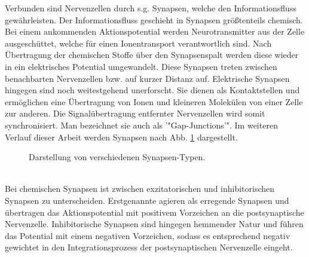 	Verbunden sind Nervenzellen durch s.g. Synapsen, welche den Informationsfluss gewährleisten. Der Informationsfluss geschieht in Synapsen größtenteils chemisch. Bei einem ankommenden Aktionspotential werden Neurotransmitter aus der Zelle ausgeschüttet, welche für einen Ionentransport verantwortlich sind. Nach Übertragung der chemischen Stoffe über den Synapsenspalt werden diese wieder in ein elektrisches Potential umgewandelt. Diese Synapsen treten zwischen benachbarten Nervenzellen bzw. auf kurzer Distanz auf. Elektrische Synapsen hingegen sind noch weitestgehend unerforscht. Sie dienen als Kontaktstellen und ermöglichen eine Übertragung von Ionen und kleineren Molekülen von einer Zelle zur anderen. Die Signalübertragung entfernter Nervenzellen wird somit synchronisiert. Man bezeichnet sie auch als '"Gap-Junctions'". Im weiteren Verlauf dieser Arbeit werden Synapsen nach Abb. \ref{fig:synapse} dargestellt.\\
	\begin{figure}[!h] %
		\centering
		\def\svgwidth{12cm}
		
		\caption{Darstellung von verschiedenen Synapsen-Typen.}
		\label{fig:synapse}
	\end{figure}\\
	Bei chemischen Synapsen ist zwischen exzitatorischen und inhibitorischen Synapsen zu unterscheiden. Erstgenannte agieren als erregende Synapsen und übertragen das Aktionspotential mit positivem Vorzeichen an die postsynaptische Nervenzelle. Inhibitorische Synapsen sind hingegen hemmender Natur und führen das Potential mit einem negativen Vorzeichen, sodass es entsprechend negativ gewichtet in den Integrationsprozess der postsynaptischen Nervenzelle eingeht.

